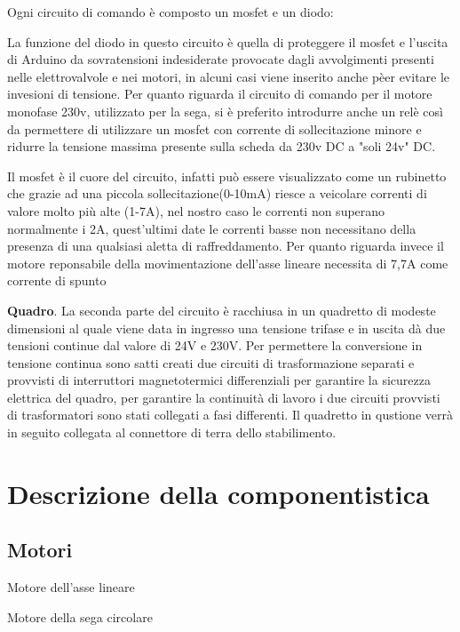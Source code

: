 \documentclass{report}
\begin{document}
\begin{description}
Ogni circuito di comando è composto un mosfet e un diodo: 
\begin{description}
\item La funzione del diodo in questo circuito è quella di proteggere il mosfet e l'uscita di Arduino da sovratensioni indesiderate provocate dagli avvolgimenti presenti nelle elettrovalvole e nei motori, in alcuni casi viene inserito anche pèer evitare le invesioni di tensione.
Per quanto riguarda il circuito di comando per il motore monofase 230v, utilizzato per la sega, si è preferito introdurre anche un relè così da permettere di utilizzare un mosfet con corrente di sollecitazione minore e ridurre la tensione massima presente sulla scheda da 230v DC a "soli 24v" DC.
\item Il mosfet è il cuore del circuito, infatti può essere visualizzato come un rubinetto che grazie ad una piccola sollecitazione(0-10mA) riesce a veicolare correnti di valore molto più alte (1-7A), nel nostro caso le correnti non superano normalmente i 2A, quest'ultimi date le correnti basse non necessitano della presenza di una qualsiasi aletta di raffreddamento.
Per quanto riguarda invece il motore reponsabile della movimentazione dell'asse lineare necessita di 7,7A come corrente di spunto
\end{description}
\item \textbf{Quadro}. La seconda parte del circuito è racchiusa in un quadretto di modeste dimensioni al quale viene data in ingresso una tensione trifase e in uscita dà due tensioni continue dal valore di 24V e 230V.
Per permettere la conversione in tensione continua sono satti creati due circuiti di trasformazione separati e provvisti di interruttori magnetotermici differenziali per garantire la sicurezza elettrica del quadro, per garantire la continuità di lavoro i due circuiti provvisti di trasformatori sono stati collegati a fasi differenti.
Il quadretto in qustione verrà in seguito collegata al connettore di terra dello stabilimento.

\end{description}
\section{Descrizione della componentistica}
\subsection{Motori}
\begin{description}
\item Motore dell'asse lineare
\item Motore della sega circolare 
\end{description}
\end{document}
